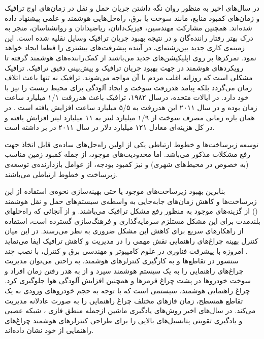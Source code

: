 


در سال‌های اخیر به منظور روان نگه داشتن جریان حمل و نقل در زمان‌های اوج ترافیک و زمان‌های کمبود منابع، مانند سوخت یا برق، راه‌حل‌هایی هوشمند و علمی پیشنهاد داده شده‌اند.
همچنین مشارکت مهندسین، فیزیک‌دانان، ریاضیدانان و روانشناسان، منجر به درک بهتر رفتار راننده‌گان و در نتیجه بهبود جریان ترافیک وسایل نقلیه شده است.
این زمینه‌ی کاری جدید بین‌رشته‌ای، در آینده پیشرفت‌های بیشتری را قطعا ایجاد خواهد نمود.
تمرکزها بر روی اپلیکیشن‌های جدید می‌باشند از کمک‌راننده‌های هوشمند گرفته تا رویکردهای هوشمند در جهت بهبود جریان ترافیک و پیش‌بینی دقیق ترافیک.
ترافیک مشکلی است که روزانه اغلب مردم با آن مواجه می‌شوند. ترافیک نه تنها باعث اتلاف زمان می‌گردد بلکه پیامد هدررفت سوخت و ایجاد آلودگی برای محیط زیست را نیز با خود دارد.
در ایالات متحده، درسال ۱۹۸۲، ترافیک باعث هدررفت ۱/۱ میلیارد ساعت زمان بوده و در سال ۲۰۱۱ این هدررفت به ۵/۵ میلیارد ساعت افزایش یافته است \cite{Walraven2016}.
در همان بازه زمانی مصرف سوخت از ۱/۹ میلیارد لیتر به ۱۱ میلیارد لیتر افزایش یافته و در کل هزینه‌ای معادل ۱۲۱ میلیارد دلار در سال ۲۰۱۱ در بر داشته است.

توسعه زیرساخت‌ها و خطوط ارتباطی یکی از اولین راه‌حل‌های ساده‌ی قابل اتخاذ جهت رفع مشکلات مذکور می‌باشد. اما محدودیت‌های موجود، از جمله کمبود زمین مناسب (به خصوص در محیط‌های شهری) و نیز کمبود بودجه، از عوامل بازدارنده‌ی توسعه‌ی زیرساخت و خطوط ارتباطی می‌باشند.

بنابرین بهبود زیرساخت‌های موجود یا حتی بهینه‌سازی نحوه‌ی استفاده از این زیرساخت‌ها و کاهش زمان‌های جابه‌جایی به واسطه‌ی سیستم‌های حمل و نقل هوشمند 
() از گزینه‌های موجود به منظور رفع مشکل ترافیک می‌باشند.
و از آنجائی که راه‌حلهای بلندمدت برای اين مشكل مستلزم
سرمايه‌گذاری و فرهنگ‌سازی گسترده است، استفاده از راهکارهای سريع  برای کاهش اين مشكل ضروری به نظر می‌رسند. در اين ميان کنترل بهينه چراغ‌های راهنمايی نقش مهمی را در مديريت و کاهش ترافيک ايفا
می‌نمايد \cite{Smith2013}.
امروزه با
پيشرفت فناوری در علوم کامپيوتر و مهندسی برق و کنترل، با نصب چند  سنسور در تقاطع‌ها و به کارگيری کنترلرهای هوشمند، به راحتی می‌توان مديريت چراغ‌های راهنمايی را به يک سيستم هوشمند سپرد و از به هدر رفتن زمان افراد و سوخت خودروها در پشت چراغ قرمزها و همچنين افزايش آلودگی هوا جلوگيری کرد. چراغ راهنمايی هوشمند، سيستمی است که با توجه به حجم خودروهای ورودی به يک تقاطع همسطح، زمان فازهای مختلف چراغ راهنمايی را به صورت عادلانه مديريت می‌کند. در سال‌های اخير روش‌های يادگيری ماشين ازجمله منطق فازی \cite{Srinivasan2003,Balaji2011}، شبكه عصبی \cite{Srinivasan2006,Chao2008} و يادگيری تقويتی \cite{El-Tantawy2014,Jacob2006} پتانسيل‌های بالايی را برای طراحی کنترلرهای هوشمند چراغ‌های
راهنمايی از خود نشان داده‌اند.

